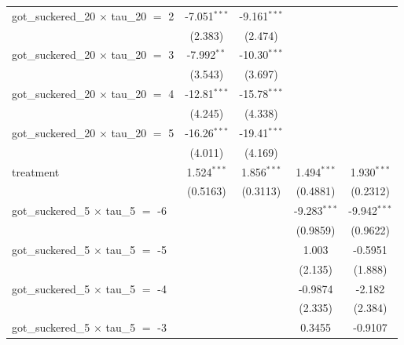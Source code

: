 \begin{tabular}{lcccc}
   got\_suckered\_20 $\times$ tau\_20 $=$ 2      & -7.051$^{***}$ & -9.161$^{***}$  &                &   \\   
                                                 & (2.383)        & (2.474)         &                &   \\   
   got\_suckered\_20 $\times$ tau\_20 $=$ 3      & -7.992$^{**}$  & -10.30$^{***}$  &                &   \\   
                                                 & (3.543)        & (3.697)         &                &   \\   
   got\_suckered\_20 $\times$ tau\_20 $=$ 4      & -12.81$^{***}$ & -15.78$^{***}$  &                &   \\   
                                                 & (4.245)        & (4.338)         &                &   \\   
   got\_suckered\_20 $\times$ tau\_20 $=$ 5      & -16.26$^{***}$ & -19.41$^{***}$  &                &   \\   
                                                 & (4.011)        & (4.169)         &                &   \\   
   treatment                                     & 1.524$^{***}$  & 1.856$^{***}$   & 1.494$^{***}$  & 1.930$^{***}$\\   
                                                 & (0.5163)       & (0.3113)        & (0.4881)       & (0.2312)\\   
   got\_suckered\_5 $\times$ tau\_5 $=$ -6       &                &                 & -9.283$^{***}$ & -9.942$^{***}$\\   
                                                 &                &                 & (0.9859)       & (0.9622)\\   
   got\_suckered\_5 $\times$ tau\_5 $=$ -5       &                &                 & 1.003          & -0.5951\\   
                                                 &                &                 & (2.135)        & (1.888)\\   
   got\_suckered\_5 $\times$ tau\_5 $=$ -4       &                &                 & -0.9874        & -2.182\\   
                                                 &                &                 & (2.335)        & (2.384)\\   
   got\_suckered\_5 $\times$ tau\_5 $=$ -3       &                &                 & 0.3455         & -0.9107\\   

\end{tabular}
